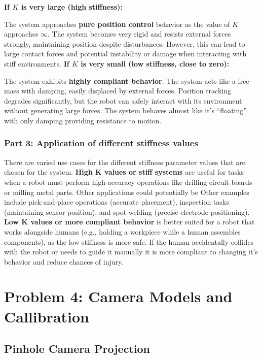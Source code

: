 \documentclass[11pt]{article}
\begin{document}
\textbf{If $K$ is very large (high stiffness):}

The system approaches \textbf{pure position control} behavior as the value of $K$ approaches $\infty$. 
The system becomes very rigid and resists external forces strongly, maintaining position despite disturbances. However, this can lead to large contact forces and potential instability or damage when interacting with stiff environments.
\newline
\textbf{If $K$ is very small (low stiffness, close to zero):}

The system exhibits \textbf{highly compliant behavior}. The system acts like a free mass with damping, easily displaced by external forces. Position tracking degrades significantly, but the robot can safely interact with its environment without generating large forces. The system behaves almost like it's ``floating'' with only damping providing resistance to motion.


\subsubsection*{Part 3: Application of different stiffness values}
There are varied use cases for the different stiffness parameter values that are chosen for the system. 
\textbf{High K values or stiff systems} are useful for tasks when a robot must perform high-accuracy operations like drilling circuit boards or milling metal parts. Other applications could potentially be Other examples include pick-and-place operations (accurate placement), inspection tasks (maintaining sensor position), and spot welding (precise electrode positioning). \textbf{Low K values or more compliant behavior} is better suited for 
a robot that works alongside humans (e.g., holding a workpiece while a human assembles components), as the low stiffness is more safe. If the human accidentally collides with the robot or needs to guide it manually it is more compliant to changing it's behavior and reduce chances of injury. 

\section{Problem 4: Camera Models and Callibration}

\subsection{Pinhole Camera Projection}
\end{document}
